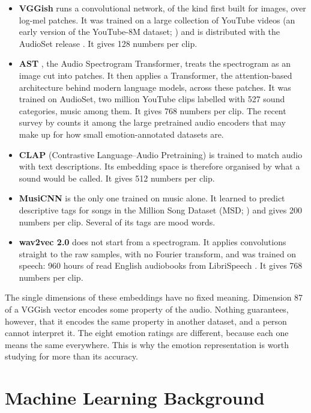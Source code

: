 \begin{itemize}
  \item \textbf{VGGish} \citep{hershey2017cnn} runs a convolutional network, of the kind first built for images, over log-mel patches. It was trained on a large collection of YouTube videos (an early version of the YouTube-8M dataset; \citealp{abu2016youtube}) and is distributed with the AudioSet release \citep{gemmeke2017audioset}. It gives 128 numbers per clip.
  \item \textbf{AST} \citep{gong2021ast}, the Audio Spectrogram Transformer, treats the spectrogram as an image cut into patches. It then applies a Transformer, the attention-based architecture behind modern language models, across these patches. It was trained on AudioSet, two million YouTube clips labelled with 527 sound categories, music among them. It gives 768 numbers per clip. The recent survey by \citet{kang2025there} counts it among the large pretrained audio encoders that may make up for how small emotion-annotated datasets are.
  \item \textbf{CLAP} (Contrastive Language--Audio Pretraining) \citep{wu2023clap} is trained to match audio with text descriptions. Its embedding space is therefore organised by what a sound would be called. It gives 512 numbers per clip.
  \item \textbf{MusiCNN} \citep{pons2019musicnn} is the only one trained on music alone. It learned to predict descriptive tags for songs in the Million Song Dataset (MSD; \citealp{bertin2011million}) and gives 200 numbers per clip. Several of its tags are mood words.
  \item \textbf{wav2vec 2.0} \citep{baevski2020wav2vec} does not start from a spectrogram. It applies convolutions straight to the raw samples, with no Fourier transform, and was trained on speech: 960 hours of read English audiobooks from LibriSpeech \citep{panayotov2015librispeech}. It gives 768 numbers per clip.
\end{itemize}

The single dimensions of these embeddings have no fixed meaning. Dimension 87 of a VGGish vector encodes some property of the audio. Nothing guarantees, however, that it encodes the same property in another dataset, and a person cannot interpret it. The eight emotion ratings are different, because each one means the same everywhere. This is why the emotion representation is worth studying for more than its accuracy.

\section{Machine Learning Background}
\label{sec:fund_ml}

